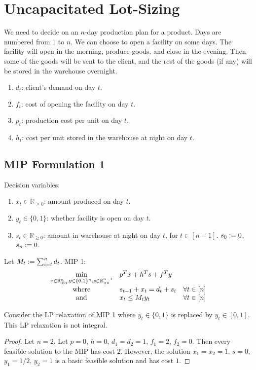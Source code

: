 \documentclass[a4paper,12pt,fleqn]{article}
\newenvironment*{tightenum}{\begin{enumerate}[noitemsep]}{\end{enumerate}}
\newcommand*{\Rpos}{\mathbb{R}_{\ge 0}}
\newcommand*{\optprog}[3]{
\begin{array}{{>{\displaystyle}c}*2{>{\displaystyle}l}}
#1 & \multicolumn{2}{>{\displaystyle}l}{#2}
#3 \end{array}}
\begin{document}
\section{Uncapacitated Lot-Sizing}

We need to decide on an $n$-day production plan for a product.
Days are numbered from 1 to $n$.
We can choose to open a facility on some days.
The facility will open in the morning, produce goods, and close in the evening.
Then some of the goods will be sent to the client, and the rest of the goods (if any)
will be stored in the warehouse overnight.
\begin{tightenum}
\item $d_t$: client's demand on day $t$.
\item $f_t$: cost of opening the facility on day $t$.
\item $p_t$: production cost per unit on day $t$.
\item $h_t$: cost per unit stored in the warehouse at night on day $t$.
\end{tightenum}

\subsection{MIP Formulation 1}

Decision variables:
\begin{tightenum}
\item $x_t \in \Rpos$: amount produced on day $t$.
\item $y_t \in \{0, 1\}$: whether facility is open on day $t$.
\item $s_t \in \Rpos$: amount in warehouse at night on day $t$, for $t \in [n-1]$.
    $s_0 := 0$, $s_n := 0$.
\end{tightenum}

Let $M_t := \sum_{i=t}^n d_t$. MIP 1:
\[ \optprog{\min_{x \in \Rpos^n, y \in \{0, 1\}^n, s \in \Rpos^{n-1}}}{p^Tx + h^Ts + f^Ty}{
\\ \textrm{where} & s_{t-1} + x_t = d_t + s_t & \forall t \in [n]
\\ \textrm{and} & x_t \le M_ty_t & \forall t \in [n]
} \]

\begin{lemma}
Consider the LP relaxation of MIP 1 where $y_t \in \{0, 1\}$ is replaced by $y_t \in [0, 1]$.
This LP relaxation is not integral.
\end{lemma}
\begin{proof}
Let $n = 2$. Let $p = 0$, $h = 0$, $d_1 = d_2 = 1$, $f_1 = 2$, $f_2 = 0$.
Then every feasible solution to the MIP has cost $2$.
However, the solution $x_1 = x_2 = 1$, $s = 0$, $y_1 = 1/2$, $y_2 = 1$
is a basic feasible solution and has cost $1$.
\end{proof}
\end{document}
